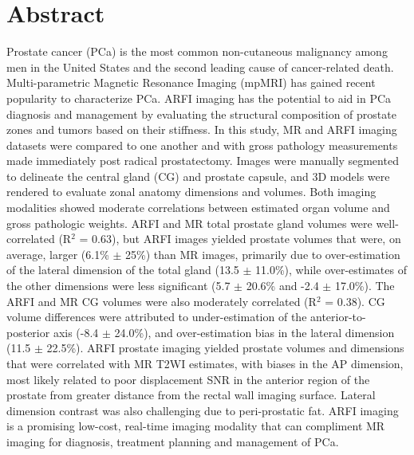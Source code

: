 \section*{Abstract}
Prostate cancer (PCa) is the most common non-cutaneous malignancy among men in
the United States and the second leading cause of cancer-related death.
Multi-parametric Magnetic Resonance Imaging (mpMRI) has gained recent
popularity to characterize PCa.  ARFI imaging has the potential to aid in PCa
diagnosis and management by evaluating the structural composition of prostate
zones and tumors based on their stiffness.  In this study, MR and ARFI imaging
datasets were compared to one another and with gross pathology measurements
made immediately post radical prostatectomy.  Images were manually segmented to
delineate the central gland (CG) and prostate capsule, and 3D models were
rendered to evaluate zonal anatomy dimensions and volumes.  Both imaging
modalities showed moderate correlations between estimated organ volume and
gross pathologic weights.  ARFI and MR total prostate gland volumes were
well-correlated (R$^2$ = 0.63), but ARFI images yielded prostate volumes that
were, on average, larger (6.1\% $\pm$ 25\%) than MR images, primarily due to
over-estimation of the lateral dimension of the total gland (13.5 $\pm$
11.0\%), while over-estimates of the other dimensions were less significant
(5.7 $\pm$ 20.6\% and -2.4 $\pm$ 17.0\%).  The ARFI and MR CG volumes were also
moderately correlated (R$^2$ = 0.38).  CG volume differences were attributed to
under-estimation of the anterior-to-posterior axis (-8.4 $\pm$ 24.0\%), and
over-estimation bias in the lateral dimension (11.5 $\pm$ 22.5\%).  ARFI
prostate imaging yielded prostate volumes and dimensions that were correlated
with MR T2WI estimates, with biases in the AP dimension, most likely related to
poor displacement SNR in the anterior region of the prostate from greater
distance from the rectal wall imaging surface.  Lateral dimension contrast was
also challenging due to peri-prostatic fat.  ARFI imaging is a promising
low-cost, real-time imaging modality that can compliment MR imaging for
diagnosis, treatment planning and management of PCa.
